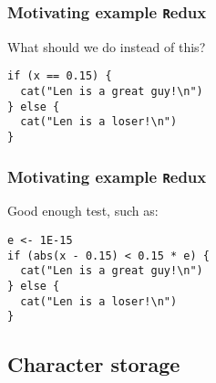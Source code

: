 \documentclass[11pt,a4paper]{article}
\begin{document}
\begin{frame}[fragile]
	\frametitle{Motivating example \texttt{R}edux}

What should we do instead of this?

\begin{verbatim} 
if (x == 0.15) {
  cat("Len is a great guy!\n") 
} else {
  cat("Len is a loser!\n")
}
\end{verbatim}
\end{frame}

\begin{frame}[fragile]
  \frametitle{Motivating example \texttt{R}edux}

Good enough test, such as:

\begin{verbatim} 
e <- 1E-15
if (abs(x - 0.15) < 0.15 * e) {
  cat("Len is a great guy!\n") 
} else {
  cat("Len is a loser!\n")
}
\end{verbatim}
\end{frame}

\mode*
\subsection{Character storage}
\end{document}
